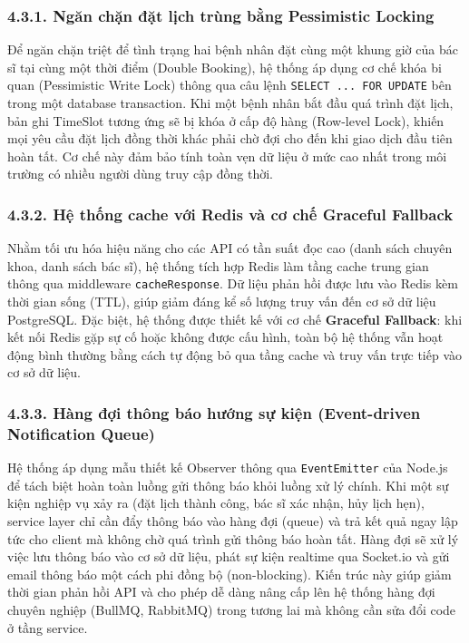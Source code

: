 \documentclass[12pt,a4paper]{report}
\begin{document}
\subsubsection*{4.3.1. Ngăn chặn đặt lịch trùng bằng Pessimistic Locking}
\hspace{1em} Để ngăn chặn triệt để tình trạng hai bệnh nhân đặt cùng một khung giờ của bác sĩ tại cùng một thời điểm (Double Booking), hệ thống áp dụng cơ chế khóa bi quan (Pessimistic Write Lock) thông qua câu lệnh \texttt{SELECT ... FOR UPDATE} bên trong một database transaction. Khi một bệnh nhân bắt đầu quá trình đặt lịch, bản ghi TimeSlot tương ứng sẽ bị khóa ở cấp độ hàng (Row-level Lock), khiến mọi yêu cầu đặt lịch đồng thời khác phải chờ đợi cho đến khi giao dịch đầu tiên hoàn tất. Cơ chế này đảm bảo tính toàn vẹn dữ liệu ở mức cao nhất trong môi trường có nhiều người dùng truy cập đồng thời.

\subsubsection*{4.3.2. Hệ thống cache với Redis và cơ chế Graceful Fallback}
\hspace{1em} Nhằm tối ưu hóa hiệu năng cho các API có tần suất đọc cao (danh sách chuyên khoa, danh sách bác sĩ), hệ thống tích hợp Redis làm tầng cache trung gian thông qua middleware \texttt{cacheResponse}. Dữ liệu phản hồi được lưu vào Redis kèm thời gian sống (TTL), giúp giảm đáng kể số lượng truy vấn đến cơ sở dữ liệu PostgreSQL. Đặc biệt, hệ thống được thiết kế với cơ chế \textbf{Graceful Fallback}: khi kết nối Redis gặp sự cố hoặc không được cấu hình, toàn bộ hệ thống vẫn hoạt động bình thường bằng cách tự động bỏ qua tầng cache và truy vấn trực tiếp vào cơ sở dữ liệu.

\subsubsection*{4.3.3. Hàng đợi thông báo hướng sự kiện (Event-driven Notification Queue)}
\hspace{1em} Hệ thống áp dụng mẫu thiết kế Observer thông qua \texttt{EventEmitter} của Node.js để tách biệt hoàn toàn luồng gửi thông báo khỏi luồng xử lý chính. Khi một sự kiện nghiệp vụ xảy ra (đặt lịch thành công, bác sĩ xác nhận, hủy lịch hẹn), service layer chỉ cần đẩy thông báo vào hàng đợi (queue) và trả kết quả ngay lập tức cho client mà không chờ quá trình gửi thông báo hoàn tất. Hàng đợi sẽ xử lý việc lưu thông báo vào cơ sở dữ liệu, phát sự kiện realtime qua Socket.io và gửi email thông báo một cách phi đồng bộ (non-blocking). Kiến trúc này giúp giảm thời gian phản hồi API và cho phép dễ dàng nâng cấp lên hệ thống hàng đợi chuyên nghiệp (BullMQ, RabbitMQ) trong tương lai mà không cần sửa đổi code ở tầng service.
\end{document}
